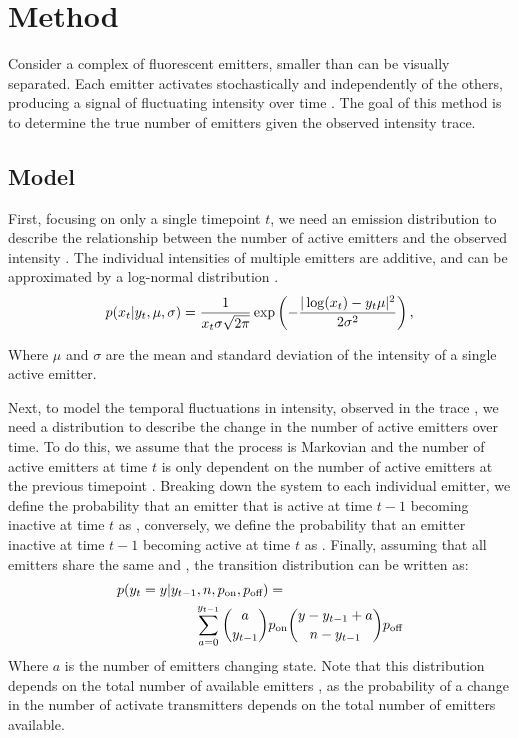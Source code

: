 \section{Method}

Consider a complex of fluorescent emitters, smaller than can be visually separated. Each emitter activates stochastically and independently of the others, producing a signal of fluctuating intensity over time .
The goal of this method is to determine the true number of emitters \truen given the observed intensity trace.

\subsection{Model}

First, focusing on only a single timepoint $t$, we need an emission distribution to describe the relationship between the number of active emitters  and the observed intensity . The individual intensities of multiple emitters are additive, and can be approximated by a log-normal distribution \cite{mutch_deconvolving_2007} \ie.
%
\begin{equation*}
  p(x_{t}|y_{t}, \mu, \sigma) =
    \frac{1}{x_{t}\sigma\sqrt{2\pi}}
    \exp \left(
      - \frac{|\log(x_{t}) - y_{t}\mu|^2}{2\sigma^2}
    \right)
  \text{,}
\end{equation*}

Where $\mu$ and $\sigma$ are the mean and standard deviation of the intensity of a single active emitter.

Next, to model the temporal fluctuations in intensity, observed in the trace \trace, we need a distribution to describe the change in the number of active emitters \states over time. To do this, we assume that the process is Markovian and the number of active emitters  at time $t$ is only dependent on the number of active emitters at the previous timepoint . Breaking down the system to each individual emitter, we define the probability that an emitter that is active at time $t-1$ becoming inactive at time $t$ as \poff, conversely, we define the probability that an emitter inactive at time $t-1$ becoming active at time $t$ as \pon. Finally, assuming that all emitters share the same \poff and \pon, the transition distribution can be written as:
%
\begin{align*}
  p(\y{t} = y | \y{t-1}, \n, \pon, \poff) &=\\
	\sum_{a = 0}^{\y{t-1}}
    {a \choose \y{t-1}}
    &\pon
    {y - \y{t-1} + a \choose \n - \y{t-1}}
    \poff
\end{align*}
%
Where $a$ is the number of emitters changing state. Note that this distribution depends on the total number of available emitters
\n, as the probability of a change in the number of activate transmitters
depends on the total number of emitters available.

